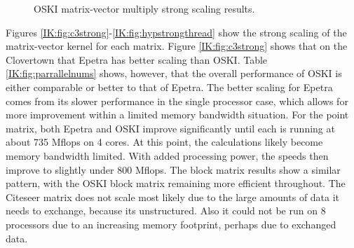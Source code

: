 \begin{figure}[htbp]
{}
\caption{OSKI matrix-vector multiply strong scaling results.}
\label{IK:fig:strongscale}
\end{figure}

Figures \ref{IK:fig:c3strong}-\ref{IK:fig:hypstrongthread} show the strong scaling of the matrix-vector
kernel for each matrix.  Figure \ref{IK:fig:c3strong}
shows that on the Clovertown that Epetra has better scaling than OSKI. Table
\ref{IK:fig:parrallelnums} shows, however, that the overall performance of OSKI is either comparable or
better to that of Epetra.
The better scaling for Epetra comes from its slower performance in the single processor case, which allows
for more improvement within a limited memory bandwidth situation.
For the point matrix, both Epetra and OSKI improve significantly
until each is running at about 735 Mflops on 4 cores.
At this point,  the calculations likely become memory bandwidth limited.
With added processing power, the speeds then improve to slightly under 800 Mflops.
The block matrix results show a similar pattern, with the OSKI block matrix remaining more efficient throughout.
The Citeseer matrix does not scale most likely due to the large amounts of data it needs to exchange, because its
unstructured.  Also it could not be run on 8 processors due to an increasing memory footprint, perhaps due to exchanged data.


